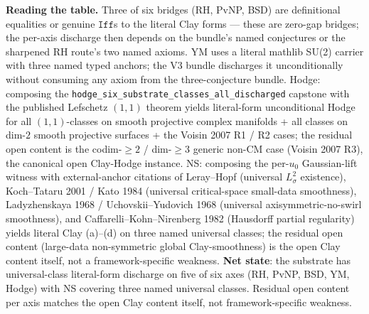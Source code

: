 \documentclass[11pt,a4paper]{amsart}
\theoremstyle{plain}
\theoremstyle{definition}
\begin{document}
\smallskip
\noindent\textbf{Reading the table.} Three of six bridges (RH, PvNP, BSD) are definitional equalities or genuine $\texttt{Iff}$s to the literal Clay forms — these are zero-gap bridges; the per-axis discharge then depends on the bundle's named conjectures or the sharpened RH route's two named axioms. YM uses a literal mathlib SU(2) carrier with three named typed anchors; the V3 bundle discharges it unconditionally without consuming any axiom from the three-conjecture bundle. Hodge: composing the \texttt{hodge\_six\_substrate\_classes\_all\_discharged} capstone with the published Lefschetz $(1,1)$ theorem yields literal-form unconditional Hodge for all $(1,1)$-classes on smooth projective complex manifolds + all classes on dim-$2$ smooth projective surfaces + the Voisin 2007 R1 / R2 cases; the residual open content is the codim-$\geq 2$ / dim-$\geq 3$ generic non-CM case (Voisin 2007 R3), the canonical open Clay-Hodge instance. NS: composing the per-$u_0$ Gaussian-lift witness with external-anchor citations of Leray--Hopf (universal $L^2_\sigma$ existence), Koch--Tataru 2001 / Kato 1984 (universal critical-space small-data smoothness), Ladyzhenskaya 1968 / Uchovskii--Yudovich 1968 (universal axisymmetric-no-swirl smoothness), and Caffarelli--Kohn--Nirenberg 1982 (Hausdorff partial regularity) yields literal Clay (a)--(d) on three named universal classes; the residual open content (large-data non-symmetric global Clay-smoothness) is the open Clay content itself, not a framework-specific weakness. \textbf{Net state}: the substrate has universal-class literal-form discharge on five of six axes (RH, PvNP, BSD, YM, Hodge) with NS covering three named universal classes. Residual open content per axis matches the open Clay content itself, not framework-specific weakness.
\end{document}
